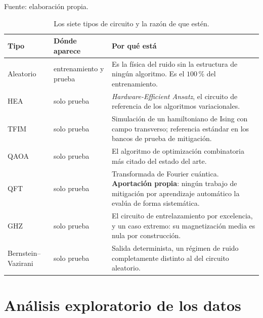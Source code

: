 \begin{table}[htbp]
    \centering
    \caption{Los siete tipos de circuito y la razón de que estén.}
    \label{tab:tipos}
    {\footnotesize
    Fuente: elaboración propia. \begin{tabular}{@{}llp{}@{}}
        \toprule
        \textbf{Tipo} & \textbf{Dónde aparece} & \textbf{Por qué está} \\
        \midrule
        Aleatorio & entrenamiento y prueba
            & Es la física del ruido sin la estructura de ningún algoritmo. Es el $100$\,\% del
              entrenamiento. \\
        HEA & solo prueba
            & \textit{Hardware-Efficient Ansatz}, el circuito de referencia de los algoritmos
              variacionales. \\
        TFIM & solo prueba
            & Simulación de un hamiltoniano de Ising con campo transverso; referencia estándar
              en los bancos de prueba de mitigación. \\
        QAOA & solo prueba
            & El algoritmo de optimización combinatoria más citado del estado del arte. \\
        QFT & solo prueba
            & Transformada de Fourier cuántica. \textbf{Aportación propia}: ningún trabajo de
              mitigación por aprendizaje automático la evalúa de forma sistemática. \\
        GHZ & solo prueba
            & El circuito de entrelazamiento por excelencia, y un caso extremo: su
              magnetización media es nula por construcción. \\
        Bernstein--Vazirani & solo prueba
            & Salida determinista, un régimen de ruido completamente distinto al del circuito
              aleatorio. \\
        \bottomrule
    \end{tabular}}
\end{table}

\section{Análisis exploratorio de los datos}
\label{sec:eda}

